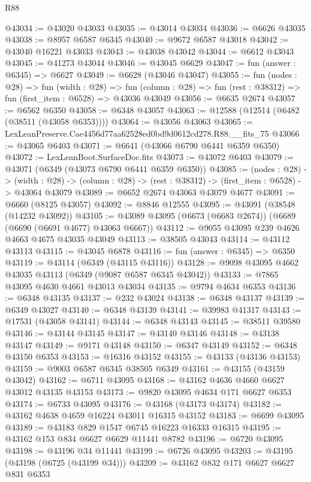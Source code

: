 \begin{lexlean}{R88}
\begin{coremodule}
@43034 := @43020 @43033
@43035 := @43014 @43034
@43036 := @6626 @43035
@43038 := @8957 @6587 @6345
@43040 := @9672 @6587 @43018
@43042 := @43040 @16221 @43033
@43043 := @43038 @43042
@43044 := @6612 @43043
@43045 := @41273 @43044
@43046 := @43045 @6629
@43047 := fun (answer : @6345) => @6627
@43049 := @6628 (@43046 @43047)
@43055 := fun (nodes : @28) =>
  fun (width : @28) =>
  fun (column : @28) => fun (rest : @38312) => fun (first_item : @6528) => @43036 @43049
@43056 := @6635 @2674
@43057 := @6562 @6350
@43058 := @6348 @43057
@43063 := @12588 (@12514 (@6482 (@38511 (@43058 @6353))))
@43064 := @43056 @43063
@43065 := LexLeanPreserve.Cae4456d77aa62528ed0bd9d0612cd278.R88.__fits_75
@43066 := @43065 @6403
@43071 := @6641 (@43066 @6790 @6441 @6359 @6350)
@43072 := LexLeanBoot.SurfaceDoc.fits
@43073 := @43072 @6403
@43079 := @43071 (@6349 (@43073 @6790 @6441 @6359 @6350))
@43085 := (nodes : @28) ->
  (width : @28) -> (column : @28) -> (rest : @38312) -> (first_item : @6528) -> @43064 @43079
@43089 := @6652 @2674 @43063 @43079 @4677
@43091 := @6660 (@8125 @43057)
@43092 := @8846 @12555
@43095 := @43091 (@38548 (@14232 @43092))
@43105 := @43089 @43095 (@6673 (@6683 @2674)) (@6689 (@6690 (@6691 @4677) @43063 @6667))
@43112 := @9055 @43095 @239 @4626 @4663 @4675 @43035 @43049
@43113 := @38505 @43043
@43114 := @43112 @43113
@43115 := @43045 @6878
@43116 := fun (answer : @6345) => @6350
@43119 := @43114 (@6349 (@43115 @43116))
@43128 := @9098 @43095 @4662 @43035 @43113 (@6349 (@9087 @6587 @6345 @43042))
@43133 := @7865 @43095 @4630 @4661 @43013 @43034
@43135 := @9794 @4634 @6353
@43136 := @6348 @43135
@43137 := @232 @43024
@43138 := @6348 @43137
@43139 := @6349 @43027
@43140 := @6348 @43139
@43141 := @39983 @41317
@43143 := @17531 (@43058 @43141)
@43144 := @6348 @43143
@43145 := @38511 @39580
@43146 := @43144 @43145
@43147 := @43140 @43146
@43148 := @43138 @43147
@43149 := @9171 @43148
@43150 := @6347 @43149
@43152 := @6348 @43150 @6353
@43153 := @16316 @43152
@43155 := @43133 (@43136 @43153)
@43159 := @9003 @6587 @6345 @38505 @6349
@43161 := @43155 (@43159 @43042)
@43162 := @6711 @43095
@43168 := @43162 @4636 @4660 @6627 @43012 @43135 @43153
@43173 := @9820 @43095 @4634 @171 @6627 @6353
@43174 := @6733 @43095
@43176 := @43168 (@43173 @43174)
@43182 := @43162 @4638 @4659 @16224 @43011 @16315 @43152
@43183 := @6699 @43095
@43189 := @43183 @829 @1547 @6745 @16223 @16333 @16315
@43195 := @43162 @153 @834 @6627 @6629 @11441 @8782
@43196 := @6720 @43095
@43198 := @43196 @34 @11441
@43199 := @6726 @43095
@43203 := @43195 (@43198 (@6725 (@43199 @34)))
@43209 := @43162 @832 @171 @6627 @6627 @831 @6353

\end{coremodule}
\end{lexlean}
